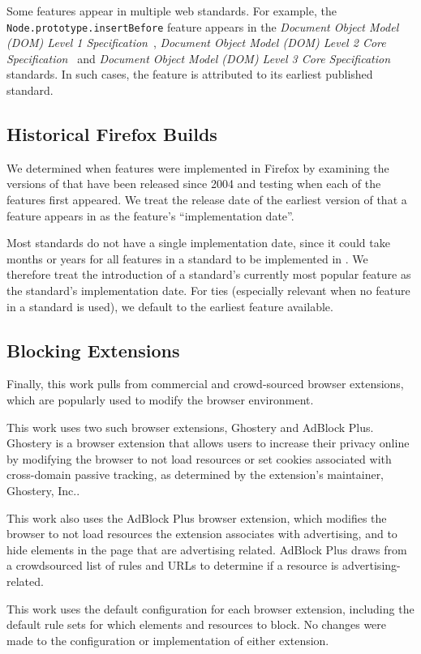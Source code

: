 Some features appear in multiple web standards.  For example, the
\texttt{Node.prototype.insertBefore} feature appears in the
\textit{Document Object Model (DOM) Level 1 Specification}~\cite{dom1w3c},
\textit{Document Object Model (DOM) Level 2 Core Specification}~\cite{dom2corew3c}
and \emph{Document Object Model (DOM) Level 3 Core Specification}~\cite{dom3corew3c}
standards.  In such cases, the feature is attributed to its earliest published
standard.


\subsection{Historical Firefox Builds}
We determined when features were implemented in Firefox by
examining the \numfirefoxes versions of \FF that have been released since 2004
and testing when each of the \numfeatures features first appeared.
We treat the release date of the earliest version of
\FF that a feature appears in as the feature's ``implementation date''.

Most standards do not have a single implementation date, since it could take
months or years for all features in a standard to be implemented in \FF.  We therefore
treat the introduction of a standard's currently most popular feature as the
standard's implementation date. For ties (especially relevant when no feature
in a standard is used), we default to the earliest feature available.



\subsection{Blocking Extensions}
\label{measurement:data-sources:data-extensions}
Finally, this work pulls from commercial and crowd-sourced browser extensions,
which are popularly used to modify the browser environment.

This work uses two such browser extensions, Ghostery and AdBlock Plus.  Ghostery is a
browser extension that allows users to increase their privacy online
by modifying the browser to not load resources or set cookies associated with
cross-domain passive tracking, as determined by the extension's maintainer, Ghostery, Inc..

This work also uses the AdBlock Plus browser extension, which modifies
the browser to not load resources the extension associates with
advertising, and to hide elements in the page that are advertising related.
AdBlock Plus draws from a crowdsourced list of rules and URLs to determine
if a resource is advertising-related.

This work uses the default configuration for each browser extension, including
the default rule sets for which elements and resources to block.
No changes were made to the configuration or implementation of either extension.